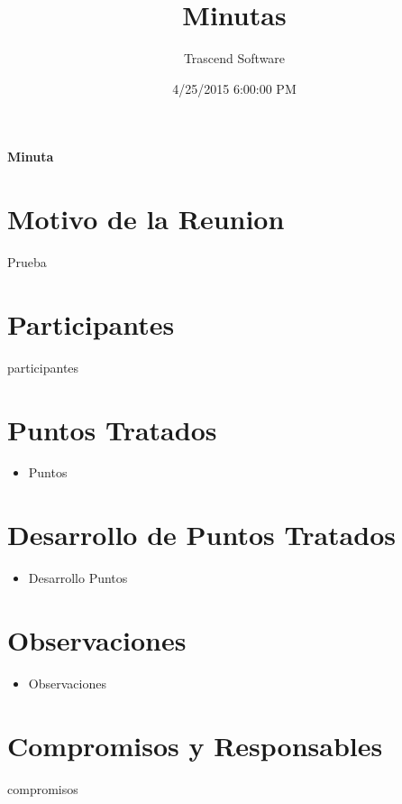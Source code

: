 \documentclass{article}
\title{Minutas}
\date{
4/25/2015 6:00:00 PM
}
\author{Trascend Software}
\begin{document}


\maketitle %
\newpage %
\begin{center}

	\huge{\bf  Minuta}

\end{center}
\section{\bf  Motivo de la Reunion}
Prueba
\section{\bf  Participantes}
participantes

\section{\bf Puntos Tratados}
	\begin{itemize}
		\item Puntos
		\end{itemize}

\section{\bf Desarrollo de Puntos Tratados}
	\begin{itemize}
		\item Desarrollo Puntos
		\end{itemize}

\section{\bf Observaciones}
	\begin{itemize}
		\item Observaciones

		\end{itemize}

\section{\bf Compromisos y Responsables}

compromisos
\end{document}
